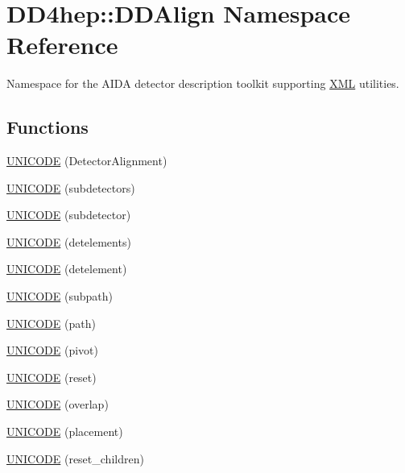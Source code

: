 \hypertarget{namespace_d_d4hep_1_1_d_d_align}{}\section{D\+D4hep\+:\+:D\+D\+Align Namespace Reference}
\label{namespace_d_d4hep_1_1_d_d_align}


Namespace for the A\+I\+DA detector description toolkit supporting \hyperlink{namespace_d_d4hep_1_1_x_m_l}{X\+ML} utilities.  


\subsection*{Functions}
\begin{DoxyCompactItemize}
\item 
\hyperlink{namespace_d_d4hep_1_1_d_d_align_a92ddad3190005e748fdd69016eba6d3d}{U\+N\+I\+C\+O\+DE} (Detector\+Alignment)
\item 
\hyperlink{namespace_d_d4hep_1_1_d_d_align_adda071bc0503c76adf54dfbf8cc47c98}{U\+N\+I\+C\+O\+DE} (subdetectors)
\item 
\hyperlink{namespace_d_d4hep_1_1_d_d_align_a8a0d0deddfffbf557cbdf46a8eac0045}{U\+N\+I\+C\+O\+DE} (subdetector)
\item 
\hyperlink{namespace_d_d4hep_1_1_d_d_align_a156a05fc9ee543a85aed3b3c832b3e80}{U\+N\+I\+C\+O\+DE} (detelements)
\item 
\hyperlink{namespace_d_d4hep_1_1_d_d_align_a72c0978998ad85f333f503745e62a9f5}{U\+N\+I\+C\+O\+DE} (detelement)
\item 
\hyperlink{namespace_d_d4hep_1_1_d_d_align_a192bfc877a53b705836a19ac5cc2555c}{U\+N\+I\+C\+O\+DE} (subpath)
\item 
\hyperlink{namespace_d_d4hep_1_1_d_d_align_adeebe0d2039ea49dce1baa19de842fd4}{U\+N\+I\+C\+O\+DE} (path)
\item 
\hyperlink{namespace_d_d4hep_1_1_d_d_align_a65c6d08fad497f0a597726589c202645}{U\+N\+I\+C\+O\+DE} (pivot)
\item 
\hyperlink{namespace_d_d4hep_1_1_d_d_align_a0a453e176add03a3cf85656e7569df85}{U\+N\+I\+C\+O\+DE} (reset)
\item 
\hyperlink{namespace_d_d4hep_1_1_d_d_align_a8a4fad494de91372f0b4a3c955838ccd}{U\+N\+I\+C\+O\+DE} (overlap)
\item 
\hyperlink{namespace_d_d4hep_1_1_d_d_align_acec73bceb26ad68abc9dcc39fa693923}{U\+N\+I\+C\+O\+DE} (placement)
\item 
\hyperlink{namespace_d_d4hep_1_1_d_d_align_ad9dbc7e91e018e588a15156da6301666}{U\+N\+I\+C\+O\+DE} (reset\+\_\+children)

\end{DoxyCompactItemize}
